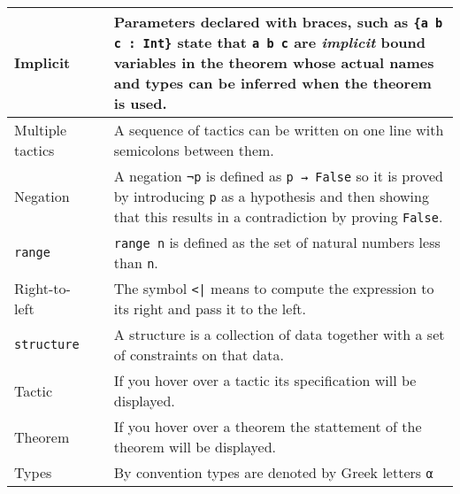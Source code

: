 \begin{tabular}{p{}|r|p{}}
Implicit&\pageref{p.implicit}&Parameters declared with braces, such as \Verb+{a b c : Int}+ state that \Verb+a b c+ are \emph{implicit} bound variables in the theorem whose actual names and types can be inferred when the theorem is used.\\\hline

Multiple tactics& \pageref{p.multiple}&A sequence of tactics can be written on one line with semicolons between them.\\\hline

Negation&\pageref{p.negation}&A negation \Verb+¬p+ is defined as \Verb+p → False+ so it is proved by introducing \Verb+p+ as a hypothesis and then showing that this results in a contradiction by proving \Verb+False+.\\\hline

\Verb+range+&\pageref{p.range}&\Verb+range n+ is defined as the set of natural numbers less than \Verb+n+.\\\hline

Right-to-left&\pageref{p.right-to-left}&The symbol \Verb+<|+ means to compute the expression to its right and pass it to the left.\\\hline

\Verb+structure+&\pageref{p.structure}&A structure is a collection of data together with a set of constraints on that data.\\\hline

Tactic&\pageref{p.tactic}&If you hover over a tactic its specification will be displayed.\\\hline

Theorem&\pageref{p.theorem}&If you hover over a theorem the stattement of the theorem will be displayed.\\\hline

Types&\pageref{p.types}&By convention types are denoted by Greek letters \Verb+α+\\\hline
\end{tabular}

